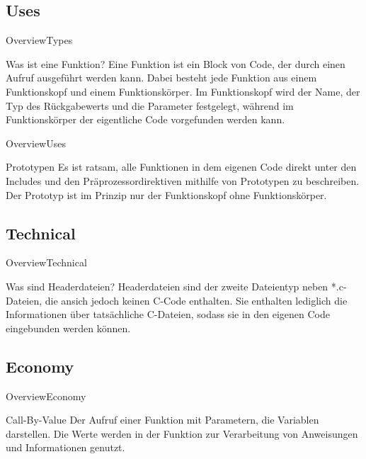 \documentclass[usenames,dvipsnames,10pt]{beamer}
\begin{document}
    \subsection{Uses}

    \begin{frame}{Overview}{Types}
        \begin{block}{Was ist eine Funktion?}
            Eine Funktion ist ein Block von Code, der durch einen Aufruf ausgeführt werden kann. Dabei besteht jede Funktion aus einem 
            Funktionskopf und einem Funktionskörper. Im Funktionskopf wird der Name, der Typ des Rückgabewerts und die Parameter festgelegt, während
            im Funktionskörper der eigentliche Code vorgefunden werden kann.
        \end{block}
    \end{frame}
    \begin{frame}{Overview}{Uses}
        \begin{block}{Prototypen}
            Es ist ratsam, alle Funktionen in dem eigenen Code direkt unter den Includes und den Präprozessordirektiven mithilfe von Prototypen
            zu beschreiben. Der Prototyp ist im Prinzip nur der Funktionskopf ohne Funktionskörper.
        \end{block}
    \end{frame}
    \subsection{Technical}
    \begin{frame}{Overview}{Technical}
        \begin{block}{Was sind Headerdateien?}
            Headerdateien sind der zweite Dateientyp neben *.c-Dateien, die ansich
            jedoch keinen C-Code enthalten. Sie enthalten lediglich die Informationen über tatsächliche
            C-Dateien, sodass sie in den eigenen Code eingebunden werden können.
        \end{block}
    \end{frame}

    \subsection{Economy}
    \begin{frame}{Overview}{Economy}
        \begin{block}{Call-By-Value}
            Der Aufruf einer Funktion mit Parametern, die Variablen
            darstellen. Die Werte werden in der Funktion zur Verarbeitung 
            von Anweisungen und Informationen genutzt.
        \end{block}
    \end{frame}
\end{document}
